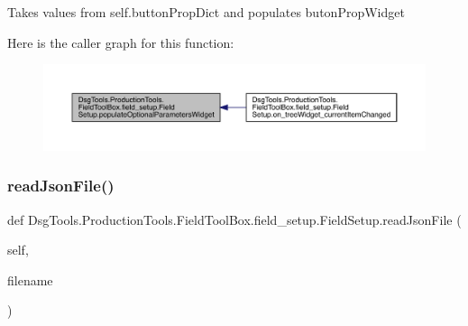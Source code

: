 \begin{DoxyVerb}Takes values from self.buttonPropDict and populates butonPropWidget
\end{DoxyVerb}
 Here is the caller graph for this function\+:
\nopagebreak
\begin{figure}[H]
\begin{center}
\leavevmode
\includegraphics[width=350pt]{class_dsg_tools_1_1_production_tools_1_1_field_tool_box_1_1field__setup_1_1_field_setup_a984912158747ae34893247521efdbbe1_icgraph}
\end{center}
\end{figure}
\mbox{\label{class_dsg_tools_1_1_production_tools_1_1_field_tool_box_1_1field__setup_1_1_field_setup_aac4a1f946a786021c21263aaf7d7466e}} 
\subsubsection{\texorpdfstring{read\+Json\+File()}{readJsonFile()}}
{\footnotesize\ttfamily def Dsg\+Tools.\+Production\+Tools.\+Field\+Tool\+Box.\+field\+\_\+setup.\+Field\+Setup.\+read\+Json\+File (\begin{DoxyParamCaption}\item[{}]{self,  }\item[{}]{filename }\end{DoxyParamCaption})}

